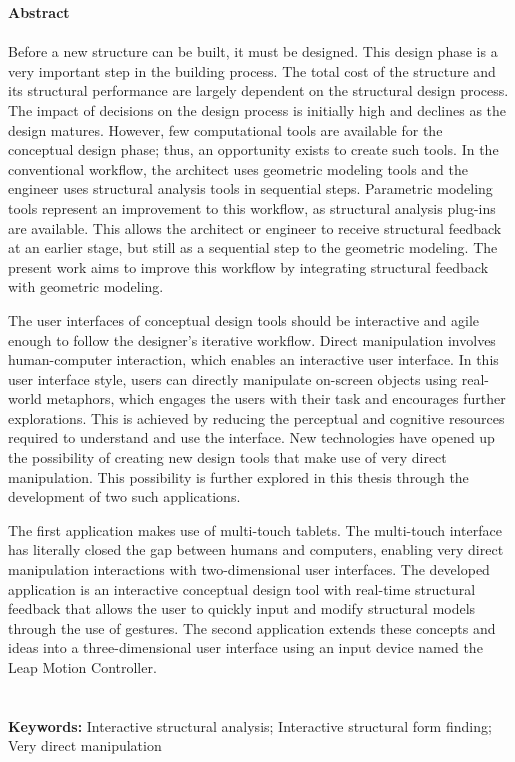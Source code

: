 \null\vfill

{\Huge \textbf{Abstract}} \\ \\
Before a new structure can be built, it must be designed. This design phase is a very important step in the building process. The total cost of the structure and its  structural performance are largely dependent on the structural design process. The impact of decisions on the design process is initially high and declines as the design matures. However, few computational tools are available for the conceptual design phase; thus, an opportunity exists to create such tools. In the conventional workflow, the architect uses geometric modeling tools and the engineer uses structural analysis tools in sequential steps. Parametric modeling tools represent an improvement to this workflow, as structural analysis plug-ins are available. This allows the architect or engineer to receive structural feedback at an earlier stage, but still as a sequential step to the geometric modeling. The present work aims to improve this workflow by integrating structural feedback with geometric modeling.

The user interfaces of conceptual design tools should be interactive and agile enough to follow the designer’s iterative workflow. Direct manipulation involves human-computer interaction, which enables an interactive user interface. In this user interface style, users can directly manipulate on-screen objects using real-world metaphors, which engages the users with their task and encourages further explorations. This is achieved by reducing the perceptual and cognitive resources required to understand and use the interface. New technologies have opened up the possibility of creating new design tools that make use of very direct manipulation. This possibility is further explored in this thesis through the development of two such applications. 

The first application makes use of multi-touch tablets. The multi-touch interface has literally closed the gap between humans and computers, enabling very direct manipulation interactions with two-dimensional user interfaces. The developed application is an interactive conceptual design tool with real-time structural feedback that allows the user to quickly input and modify structural models through the use of gestures. The second application extends these concepts and ideas into a three-dimensional user interface using an input device named the Leap Motion Controller.
\\
\\
\\
\textbf{Keywords:} Interactive structural analysis; Interactive structural form finding; Very direct manipulation



\vfill\vfill\vfill\vfill\null
